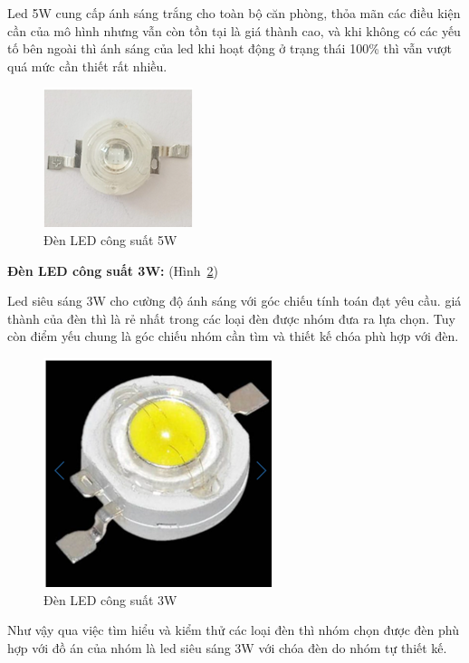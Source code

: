Led 5W cung cấp ánh sáng trắng cho toàn bộ căn phòng, thỏa mãn các điều kiện cần của mô hình nhưng vẫn còn tồn tại là giá thành cao, và khi không có các yếu tố bên ngoài thì ánh sáng của led khi hoạt động ở trạng thái 100\% thì vẫn vượt quá mức cần thiết rất nhiều.
\begin{center}
    \begin{figure}[ht]
    \begin{center}
     \includegraphics[scale=1]{Chapters/Chapter3/Images/Led5W}
    \end{center}
    \caption{Đèn LED công suất 5W}
    \label{fig:5W}
    \end{figure}
\end{center}

\textbf{Đèn LED công suất 3W:} (Hình~\ref{fig:3W})

Led siêu sáng 3W cho cường độ ánh sáng với góc chiếu tính toán đạt yêu cầu. giá thành của đèn thì là rẻ nhất trong các loại đèn được nhóm đưa ra lựa chọn. Tuy còn điểm yếu chung là góc chiếu nhóm cần tìm và thiết kế chóa phù hợp với đèn.
\begin{center}
    \begin{figure}[ht]
    \begin{center}
     \includegraphics[scale=1]{Chapters/Chapter3/Images/Led3W}
    \end{center}
    \caption{Đèn LED công suất 3W}
    \label{fig:3W}
    \end{figure}
\end{center}

Như vậy qua việc tìm hiểu và kiểm thử các loại đèn thì nhóm chọn được đèn phù hợp với đồ án của nhóm là led siêu sáng 3W với chóa đèn do nhóm tự thiết kế.
